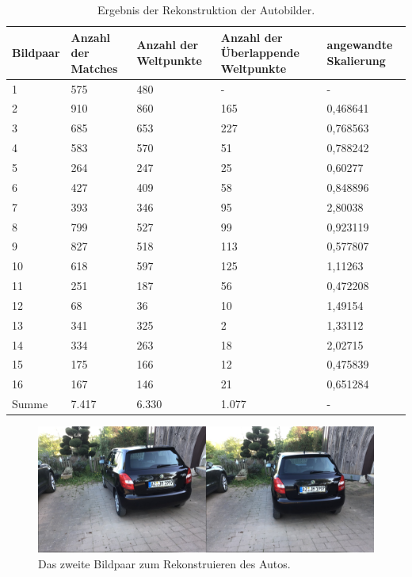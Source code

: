 \begin{table}
    \begin{tabularx}{\textwidth}{XXXXX}
        \toprule
        Bildpaar &  Anzahl der Matches & Anzahl der Weltpunkte & Anzahl der Überlappende Weltpunkte & angewandte Skalierung \\ 
        \midrule
        1  & 575 & 480 & -  & - \\
        2  & 910 & 860 & 165 & 0,468641 \\
        3  & 685 & 653 & 227 & 0,768563 \\
        4  & 583 & 570 & 51  & 0,788242 \\
        5  & 264 & 247 & 25  & 0,60277 \\
        6  & 427 & 409 & 58  & 0,848896 \\
        7  & 393 & 346 & 95  & 2,80038 \\
        8  & 799 & 527 & 99  & 0,923119 \\
        9  & 827 & 518 & 113 & 0,577807 \\
        10 & 618 & 597 & 125 & 1,11263 \\
        11 & 251 & 187 & 56  & 0,472208 \\
        12 & 68  & 36  & 10  & 1,49154 \\
        13 & 341 & 325 & 2   & 1,33112 \\
        14 & 334 & 263 & 18  & 2,02715 \\
        15 & 175 & 166 & 12  & 0,475839 \\
        16 & 167 & 146 & 21  & 0,651284 \\
        \midrule
        Summe & 7.417 & 6.330 & 1.077 & - \\
        \bottomrule
    \end{tabularx}
    \caption{Ergebnis der Rekonstruktion der Autobilder.}
    \label{tab:car-results}
\end{table}

\begin{figure}
    \includegraphics[width=\textwidth]{src/img/car_second_pair.jpg}
    \caption{Das zweite Bildpaar zum Rekonstruieren des Autos.}
    \label{fig:car-second-pair}
\end{figure}

